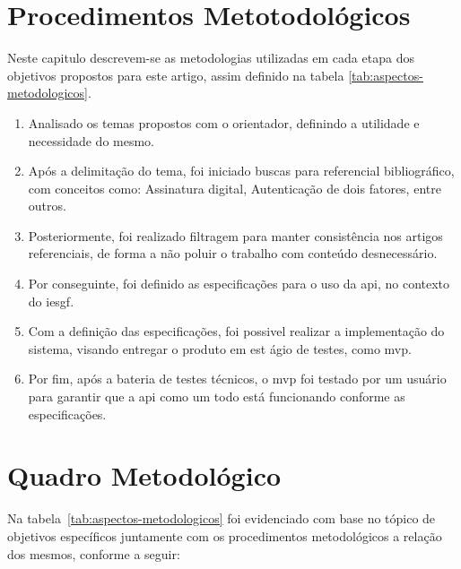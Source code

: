 \section{Procedimentos Metotodológicos}\label{sec:quadro-relacional}

Neste capitulo descrevem-se as metodologias utilizadas em cada
etapa dos objetivos propostos para este artigo, assim definido na
tabela \ref{tab:aspectos-metodologicos}.
\newcommand{\definicaoTema}{
    \item Analisado os temas propostos com o orientador, definindo
    a utilidade e necessidade do mesmo.
}
\newcommand{\buscaArtigos}{
    \item Após a delimitação do tema, foi iniciado buscas para
    referencial bibliográfico, com conceitos como: Assinatura
    digital, Autenticação de dois fatores, entre outros.
}
\newcommand{\filtragemArtigos}{
    \item Posteriormente, foi realizado filtragem para manter
    consistência nos artigos referenciais, de forma a não poluir o
    trabalho com conteúdo desnecessário.
}
\newcommand{\definicaoEspecificacoes}{
    \item Por conseguinte, foi definido as especificações para o
    uso da \acrshort{api}, no contexto do \acrfull{iesgf}.
}
\newcommand{\implementacaoAPI}{
    \item Com a definição das especificações, foi possivel realizar
    a implementação do sistema, visando entregar o produto em est ágio
    de testes, como \acrfull{mvp}.
}
\newcommand{\testeAPI}{
    \item Por fim, após a bateria de testes técnicos, o \acrshort{mvp}
    foi testado por um usuário para garantir que a \acrshort{api}
    como um todo está funcionando conforme as especificações.
}
\begin{enumerate}[label=\arabic*\textdegree\space Etapa:,
    leftmargin=2cm]
    \definicaoTema
    \buscaArtigos
    \filtragemArtigos
    \definicaoEspecificacoes
    \implementacaoAPI
    \testeAPI
\end{enumerate}
\section{Quadro Metodológico}\label{sec:quadro-metodologico}

Na tabela~\ref{tab:aspectos-metodologicos} foi evidenciado com base no
tópico de objetivos específicos juntamente com os procedimentos
metodológicos a relação dos mesmos, conforme a seguir:

